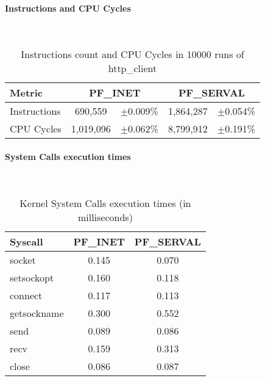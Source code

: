 \paragraph{Instructions and CPU Cycles} \hfill \\
\begin{table}
\begin{center}
  \begin{tabular}{l||cc|cc}
  	\toprule
  	Metric			&	\multicolumn{2}{c}{PF\_INET}	&	\multicolumn{2}{c}{PF\_SERVAL}	\\
  	\midrule
    Instructions	&	690,559		&	$\pm$0.009\%	&	1,864,287	&	$\pm$0.054\%	\\
    CPU Cycles		&	1,019,096	&	$\pm$0.062\%	&	8,799,912	&	$\pm$0.191\%	\\
    \bottomrule
  \end{tabular}
  \caption[Benchmark: Instructions and CPU Cycles]{Instructions count and CPU Cycles in 10000 runs of http\_client}
\end{center}
\end{table}

\paragraph{System Calls execution times} \hfill \\
\begin{table}
\begin{center}
  \begin{tabular}{l||c|c}
  	\toprule
  	Syscall			&	PF\_INET	&	PF\_SERVAL	\\
  	\midrule
    socket			&	0.145		&	0.070		\\
    setsockopt		&	0.160		&	0.118		\\
    connect			&	0.117		&	0.113		\\
    getsockname		&	0.300		&	0.552		\\
    send			&	0.089		&	0.086		\\
    recv			&	0.159		&	0.313		\\
    close			&	0.086		&	0.087		\\
    \bottomrule
  \end{tabular}
  \caption[Benchmark: System Call execution times]{Kernel System Calls execution times (in milliseconds)}
\end{center}
\end{table}

